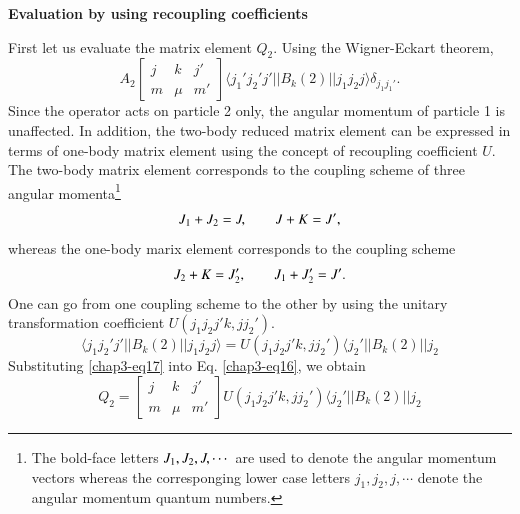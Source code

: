\medskip
\noindent \textbf{\large Evaluation by using recoupling coefficients}
\medskip

\noindent First let us evaluate the matrix element $Q_2$. Using the Wigner-Eckart theorem,
\begin{equation}
A_2 \begin{bmatrix}j & k & j'\\m & \mu & m'\end{bmatrix}
\langle j_1' j_2' j' || B_k (2) || j_1 j_2 j \rangle \delta_{j_1 j_1'}. \label{chap3-eq16}
\end{equation}
Since the operator acts on particle 2 only, the angular momentum of particle 1 is unaffected. In addition, the two-body reduced matrix element can be expressed in terms of one-body matrix element using the concept of recoupling coefficient $U$. The two-body matrix element corresponds to the coupling scheme of three angular momenta\footnote{The bold-face letters ${\boldmath  J}_1, {\boldmath  J}_2, {\boldmath  J}, \cdots$ are used to denote the angular momentum vectors whereas the corresponging lower case letters $j_1, j_2, j, \cdots$ denote the angular momentum quantum numbers.}
$$
{\boldmath  J}_1 + {\boldmath  J}_2 = {\boldmath  J}, \qquad {\boldmath  J}+ {\boldmath  K}= {\boldmath  J}',
$$
whereas the one-body marix element corresponds to the coupling scheme
$$
{\boldmath  J}_2 + {\boldmath  K} = {\boldmath  J}_2', \qquad {\boldmath  J}_1+ {\boldmath  J}_2'= {\boldmath  J}'.
$$
One can go from one coupling scheme to the other by using the unitary transformation coefficient $U(j_1 j_2 j' k, j j_2')$.
\begin{equation}
\langle j_1 j_2' j' || B_k (2) || j_1 j_2 j \rangle = U (j_1 j_2 j' k, j j_2') \langle j_2' || B_k (2) || j_2 \label{chap3-eq17}
\end{equation}
Substituting \eqref{chap3-eq17} into Eq. \eqref{chap3-eq16}, we obtain
\begin{equation}
Q_2 = \begin{bmatrix}j & k & j'\\m & \mu & m'\end{bmatrix}
U (j_1 j_2 j' k, j j_2') \langle j_2' || B_k (2) || j_2 \label{chap3-eq18}
\end{equation}

